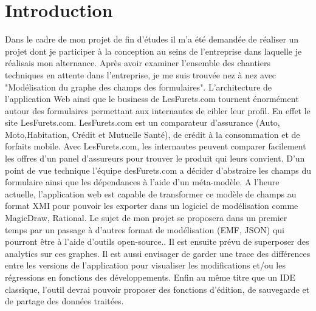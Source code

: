 \chapter{Introduction}
Dans le cadre de mon projet de fin d'études il m'a été demandée de réaliser un projet dont je participer à la conception au seins de l'entreprise dans laquelle je réalisais mon alternance. Après avoir examiner l'ensemble des chantiers techniques en attente dans l'entreprise, je me suis trouvée nez à nez avec "Modélisation du graphe des champs des formulaires". L'architecture de l'application Web ainsi que le business de LesFurets.com tournent énormément autour des formulaires permettant aux internautes de cibler leur profil. En effet le site LesFurets.com. LesFurets.com est un comparateur d'assurance (Auto, Moto,Habitation, Crédit et Mutuelle Santé), de crédit à la consommation et de forfaits mobile. Avec LesFurets.com, les internautes peuvent comparer facilement les offres d’un panel d’assureurs pour trouver le produit qui leurs convient. D’un point de vue technique l’équipe desFurets.com a décider d’abstraire les champs du formulaire ainsi que les dépendances à l’aide d'un méta-modèle. A l’heure actuelle, l’application web est capable de transformer ce modèle de champs au format XMI pour pouvoir les exporter dans un logiciel de modélisation comme MagicDraw, Rational. Le sujet de mon projet se proposera dans un premier temps par un passage à d’autres format de modélisation (EMF, JSON) qui pourront être à l'aide d'outils open-source.. Il est ensuite prévu de superposer des analytics sur ces graphes. Il est aussi envisager de garder une trace des différences entre les versions de l’application pour visualiser les modifications et/ou les régressions en fonctions des développements. Enfin au même titre que un IDE classique, l’outil devrai pouvoir proposer des fonctions d’édition, de sauvegarde et de partage des données traitées.
